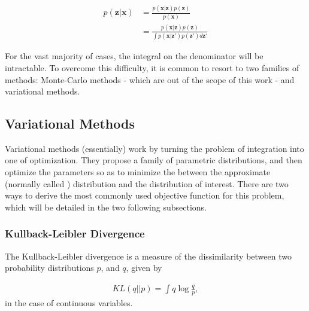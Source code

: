 \begin{align}
    p(\bm{z}|\bm{x}) &= \frac{p(\bm{x}|\bm{z})p(\bm{z})}{p(\bm{x})} \\
                     &= \frac{p(\bm{x}|\bm{z})p(\bm{z})}{\int p(\bm{x}|\bm{z'})p(\bm{z'}) d\bm{z'}}
\end{align}

For the vast majority of cases, the integral on the denominator will be
intractable. To overcome this difficulty, it is common to resort to two families
of methods: Monte-Carlo methods - which are out of the scope of this work -
and variational methods.
%
%

\subsection{Variational Methods}
\label{subsection:variational}
Variational methods (essentially) work by turning the problem of integration into one of
optimization. They propose a family of parametric distributions, and then
optimize the parameters so as to minimize the  between the approximate
(normally called ) distribution and the distribution of interest.
There are two ways to derive the most commonly used objective function for
this problem, which will be detailed in the two following subsections.

\subsubsection{Kullback-Leibler Divergence}
\label{subsubsection:kldiv}

The Kullback-Leibler divergence is a measure of the dissimilarity between two probability
distributions $p$, and $q$, given by

\begin{align}
    KL(q||p) = \int q \log\frac{q}{p},
\end{align} in the case of continuous variables.

